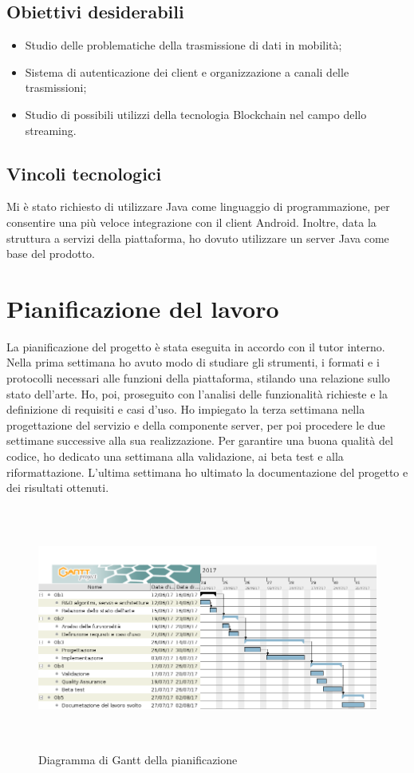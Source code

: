    \subsection{Obiettivi desiderabili}
   \begin{itemize}
      \item{Studio delle problematiche della trasmissione di dati in mobilità;}
      \item{Sistema di autenticazione dei client e organizzazione a canali delle trasmissioni;}
      \item{Studio di possibili utilizzi della tecnologia Blockchain nel campo dello streaming.}
   \end{itemize}

   \subsection{Vincoli tecnologici}
   Mi è stato richiesto di utilizzare Java come linguaggio di programmazione, per consentire una più veloce integrazione con il client Android. Inoltre, data la struttura a servizi della piattaforma, ho dovuto utilizzare un server Java come base del prodotto.

\section{Pianificazione del lavoro}
La pianificazione del progetto è stata eseguita in accordo con il tutor interno. Nella prima settimana ho avuto modo di studiare gli strumenti, i formati e i protocolli necessari alle funzioni della piattaforma, stilando una relazione sullo stato dell'arte. Ho, poi, proseguito con l'analisi delle funzionalità richieste e la definizione di requisiti e casi d'uso. Ho impiegato la terza settimana nella progettazione del servizio e della componente server, per poi procedere le due settimane successive alla sua realizzazione. Per garantire una buona qualità del codice, ho dedicato una settimana alla validazione, ai beta test e alla riformattazione. L'ultima settimana ho ultimato la documentazione del progetto e dei risultati ottenuti.
\begin{figure}[H]
   \begin{center}
      \includegraphics[height=8cm,width=15cm,keepaspectratio]{immagini/pianificazione-gantt}
      \caption{Diagramma di Gantt della pianificazione}
   \end{center}
\end{figure}

